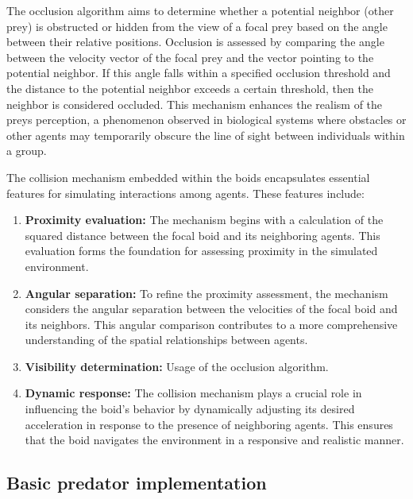 \documentclass[9pt]{pnas-new}
\begin{document}
The occlusion algorithm aims to determine whether a potential neighbor (other prey) is obstructed or hidden from the view of a 
focal prey based on the angle between their relative positions. Occlusion is assessed by comparing the angle between the velocity 
vector of the focal prey and the vector pointing to the potential neighbor. If this angle falls within a specified occlusion threshold
and the distance to the potential neighbor exceeds a certain threshold, then the neighbor is considered occluded. 
This mechanism enhances the realism of the preys perception, a phenomenon observed in biological systems 
where obstacles or other agents may temporarily obscure the line of sight between individuals within a group.

The collision mechanism embedded within the boids encapsulates essential features for simulating interactions among agents. These features include:
\begin{enumerate}
	\item \textbf{Proximity evaluation:}
	The mechanism begins with a calculation of the squared distance between the focal boid and its neighboring agents. 
	This evaluation forms the foundation for assessing proximity in the simulated environment.
	\item \textbf{Angular separation:}
	To refine the proximity assessment, the mechanism considers the angular separation between the velocities of the focal boid and its neighbors. 
	This angular comparison contributes to a more comprehensive understanding of the spatial relationships between agents.
	\item \textbf{Visibility determination:} 
	Usage of the occlusion algorithm.
	\item \textbf{Dynamic response:}
	The collision mechanism plays a crucial role in influencing the boid's behavior by dynamically adjusting its desired acceleration in response to the presence of neighboring agents. 
	This ensures that the boid navigates the environment in a responsive and realistic manner.
\end{enumerate}

\subsection*{Basic predator implementation}
\end{document}
